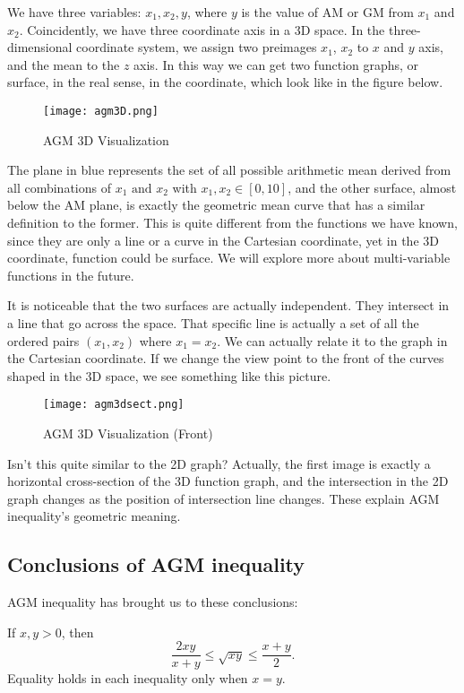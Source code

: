 We have three variables: $x_1, x_2, y$, where $y$ is the value of AM or GM from $x_1$ and $x_2$. Coincidently, we have three coordinate
axis in a 3D space. In the three-dimensional coordinate system, we assign two preimages $x_1$, $x_2$ to $x$ and $y$ axis, and the mean
to the $z$ axis. In this way we can get two function graphs, or surface, in the real sense, in the coordinate, which look like in the 
figure below.
\begin{figure}[H]
    \centering
    \texttt{[image: agm3D.png]}
    \caption{AGM 3D Visualization}
\end{figure}

The plane in blue represents the set of all possible arithmetic mean derived from all combinations of $x_1 \text{ and }x_2$ with $x_1,x_2\in [0,10]$, and the other 
surface, almost below the AM plane, is exactly the geometric mean curve that has a similar definition to the former. This is quite different from the functions
we have known, since they are only a line or a curve in the Cartesian coordinate, yet in the 3D coordinate, function could be surface. We will explore more
about multi-variable functions in the future. 

It is noticeable that the two surfaces are actually independent. They intersect in a line that go across the space. That specific line is actually a set of all the
ordered pairs $(x_1,x_2)$ where $x_1 = x_2$. We can actually relate it to the graph in the Cartesian coordinate. If we change the view point to the front of the
curves shaped in the 3D space, we see something like this picture.
\begin{figure}[H]
    \centering
    \texttt{[image: agm3dsect.png]}
    \caption{AGM 3D Visualization (Front)}
\end{figure}
Isn't this quite similar to the 2D graph? Actually, the first image is exactly a horizontal cross-section of the 3D function graph, and the intersection in the 2D 
graph changes as the position of intersection line changes. These explain AGM inequality's geometric meaning.

\subsection*{Conclusions of AGM inequality}
AGM inequality has brought us to these conclusions:
    \begin{corollary}
If $x, y > 0$, then
\[\frac{2xy}{x+y} \leq \sqrt{xy} \leq \frac{x+y}{2}.\]
Equality holds in each inequality only when $x = y$.
\end{corollary}

